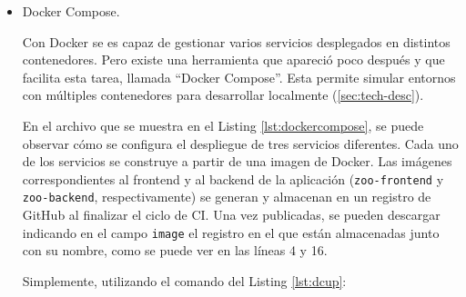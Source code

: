 \begin{itemize}
    \begin{lstlisting}[language=bash,label=lst:dockerbuildrun]{Construir y correr una imagen de Docker}
    docker build -t my-image .

    docker run --rm -d -p 8080:80 my-image
    \end{lstlisting}

    El comando de la línea 1 construye la imagen que se define en el \texttt{Dockerfile} del directorio de trabajo actual (\texttt{.}), con el nombre \texttt{my-image}. Con el siguiente comando se ejecuta la imagen. Las \textit{flags} indican:

    \begin{itemize}
      \item \texttt{--rm}

        Se eliminará el contenedor creado al finalizar su ejecución.

      \item \texttt{-d}

        El contenedor correrá en \textit{background}.

      \item \texttt{-p 8080:80}

        Se mapea el puerto 8080 de la máquina local al puerto 80 del contenedor.
    \end{itemize}

  \item Docker Compose. \label{tech:docker-compose}

    Con Docker se es capaz de gestionar varios servicios desplegados en distintos contenedores. Pero existe una herramienta que apareció poco después y que facilita esta tarea, llamada ``Docker Compose''\cite{docker-compose}. Esta permite simular entornos con múltiples contenedores para desarrollar localmente (\ref{sec:tech-desc}).

    En el archivo que se muestra en el Listing \ref{lst:dockercompose}, se puede observar cómo se configura el despliegue de tres servicios diferentes. Cada uno de los servicios se construye a partir de una imagen de Docker. Las imágenes correspondientes al frontend y al backend de la aplicación (\texttt{zoo-frontend} y \texttt{zoo-backend}, respectivamente) se generan y almacenan en un registro de GitHub al finalizar el ciclo de CI. Una vez publicadas, se pueden descargar indicando en el campo \texttt{image} el registro en el que están almacenadas junto con su nombre, como se puede ver en las líneas 4 y 16.

    Simplemente, utilizando el comando del Listing \ref{lst:dcup}:


\end{itemize}
